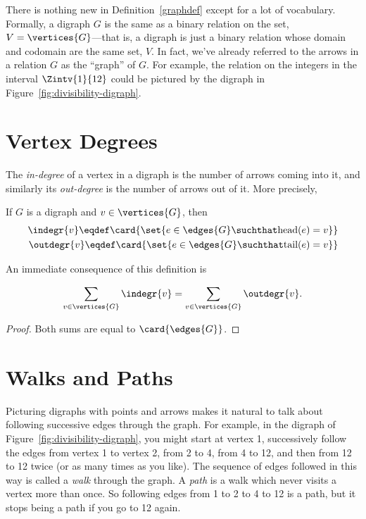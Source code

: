There is nothing new in Definition~\ref{graphdef} except for a lot of
vocabulary.  Formally, a digraph $G$ is the same as a binary relation
on the set, $V = \vertices{G}$---that is, a digraph is just a binary
relation whose domain and codomain are the same set, $V$.  In fact,
we've already referred to the arrows in a relation $G$ as the
``graph'' of $G$.  For example, the  relation on the
integers in the interval $\Zintv{1}{12}$ could be pictured by the
digraph in Figure~\ref{fig:divisibility-digraph}.

\section{Vertex Degrees}
The \emph{in-degree} of a vertex in a digraph is the number of arrows
coming into it, and similarly its \emph{out-degree} is the number of
arrows out of it.  More precisely,
\begin{definition}\label{digraph-degree}
If $G$ is a digraph and $v \in \vertices{G}$, then
\begin{align*}
\indegr{v} \eqdef \card{\set{ e \in \edges{G} \suchthat \text{head}(e) = v}}\\
\outdegr{v} \eqdef \card{\set{ e \in \edges{G} \suchthat \text{tail}(e) = v}}\\
\end{align*}
\end{definition}

An immediate consequence of this definition is
\begin{lemma}\label{digraph-handshake}
\[
\sum_{v \in \vertices{G}} \indegr{v} = \sum_{v \in \vertices{G}} \outdegr{v}.
\]
\end{lemma}
\begin{proof}
Both sums are equal to $\card{\edges{G}}$.
\end{proof}

\begin{problems}
\examproblems
{}
\end{problems}

\section{Walks and Paths}\label{sec:diwalks}
Picturing digraphs with points and arrows makes it natural to talk
about following successive edges through the graph.  For example, in
the digraph of Figure~\ref{fig:divisibility-digraph}, you might start
at vertex 1, successively follow the edges from vertex 1 to vertex 2,
from 2 to 4, from 4 to 12, and then from 12 to 12 twice (or as many
times as you like).  The sequence of edges followed in this way is
called a \emph{walk} through the graph.  A \emph{path} is a walk which
never visits a vertex more than once.  So following edges from 1 to 2
to 4 to 12 is a path, but it stops being a path if you go to 12 again.

